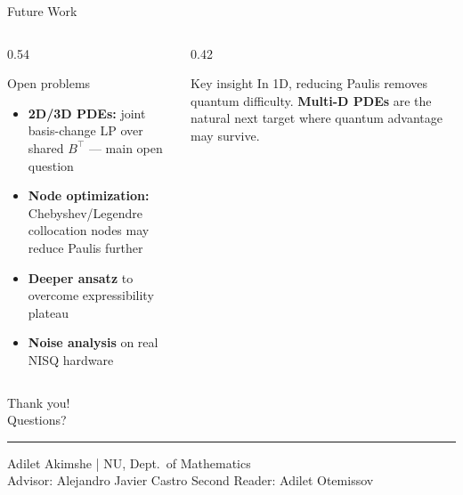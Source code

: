 \documentclass{beamer}
\begin{document}
\begin{frame}{Future Work}

  \begin{columns}[T]
    \begin{column}{0.54\textwidth}
      \begin{block}{Open problems}
        \begin{itemize}\setlength\itemsep{4pt}
          \item \textbf{2D/3D PDEs:} joint basis-change LP over
                shared $B^\top$ — main open question
          \item \textbf{Node optimization:} Chebyshev/Legendre
                collocation nodes may reduce Paulis further
          \item \textbf{Deeper ansatz} to overcome expressibility plateau
          \item \textbf{Noise analysis} on real NISQ hardware
        \end{itemize}
      \end{block}
    \end{column}
    \begin{column}{0.42\textwidth}
      \begin{alertblock}{Key insight}
        In 1D, reducing Paulis removes quantum difficulty.
        \textbf{Multi-D PDEs} are the natural next target where
        quantum advantage may survive.
      \end{alertblock}
    \end{column}
  \end{columns}
\end{frame}

\begin{frame}[plain]
  \vfill
  \begin{center}
    {\Large Thank you!}\\[12pt]
    {\large Questions?}\\[20pt]
    \hrule
    \vspace{8pt}
    {\small
    Adilet Akimshe \quad|\quad
    NU, Dept.\ of Mathematics\\[4pt]
    Advisor: Alejandro Javier Castro \quad
    Second Reader: Adilet Otemissov
    }
  \end{center}
  \vfill
\end{frame}
\end{document}
